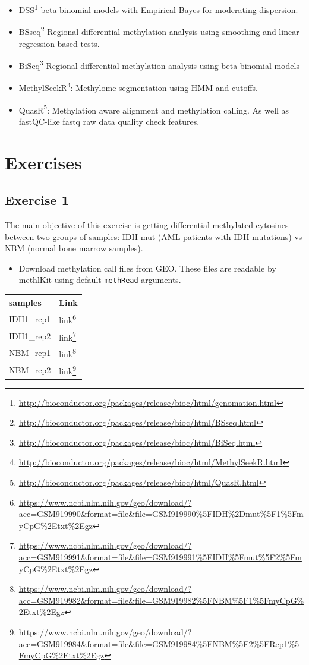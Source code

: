 \documentclass[12pt,]{krantz}
\providecommand{\tightlist}{%
  \setlength{\itemsep}{0pt}\setlength{\parskip}{0pt}}
\renewcommand{\href}[2]{#2\footnote{\url{#1}}}
\begin{document}
\begin{itemize}
\tightlist
\item
  \href{http://bioconductor.org/packages/release/bioc/html/genomation.html}{DSS} beta-binomial models with Empirical Bayes for moderating dispersion.
\item
  \href{http://bioconductor.org/packages/release/bioc/html/BSseq.html}{BSseq} Regional differential methylation analysis using smoothing and linear regression based tests.
\item
  \href{http://bioconductor.org/packages/release/bioc/html/BiSeq.html}{BiSeq} Regional differential methylation analysis using beta-binomial models
\item
  \href{http://bioconductor.org/packages/release/bioc/html/MethylSeekR.html}{MethylSeekR}: Methylome segmentation using HMM and cutoffs.
\item
  \href{http://bioconductor.org/packages/release/bioc/html/QuasR.html}{QuasR}: Methylation aware alignment and methylation calling. As well as fastQC-like fastq raw data quality check features.
\end{itemize}

\hypertarget{exercises-7}{%
\section{Exercises}\label{exercises-7}}

\hypertarget{exercise-1}{%
\subsection{Exercise 1}\label{exercise-1}}

The main objective of this exercise is getting differential methylated cytosines between two groups of samples: IDH-mut (AML patients with IDH mutations) vs NBM (normal bone marrow samples).

\begin{itemize}
\tightlist
\item
  Download methylation call files from GEO. These files are readable by methlKit using default \texttt{methRead} arguments.
\end{itemize}

\begin{longtable}[]{@{}ll@{}}
\toprule
samples & Link\tabularnewline
\midrule
\endhead
IDH1\_rep1 & \href{https://www.ncbi.nlm.nih.gov/geo/download/?acc=GSM919990\&format=file\&file=GSM919990\%5FIDH\%2Dmut\%5F1\%5FmyCpG\%2Etxt\%2Egz}{link}\tabularnewline
IDH1\_rep2 & \href{https://www.ncbi.nlm.nih.gov/geo/download/?acc=GSM919991\&format=file\&file=GSM919991\%5FIDH\%5Fmut\%5F2\%5FmyCpG\%2Etxt\%2Egz}{link}\tabularnewline
NBM\_rep1 & \href{https://www.ncbi.nlm.nih.gov/geo/download/?acc=GSM919982\&format=file\&file=GSM919982\%5FNBM\%5F1\%5FmyCpG\%2Etxt\%2Egz}{link}\tabularnewline
NBM\_rep2 & \href{https://www.ncbi.nlm.nih.gov/geo/download/?acc=GSM919984\&format=file\&file=GSM919984\%5FNBM\%5F2\%5FRep1\%5FmyCpG\%2Etxt\%2Egz}{link}\tabularnewline
\bottomrule
\end{longtable}
\end{document}
